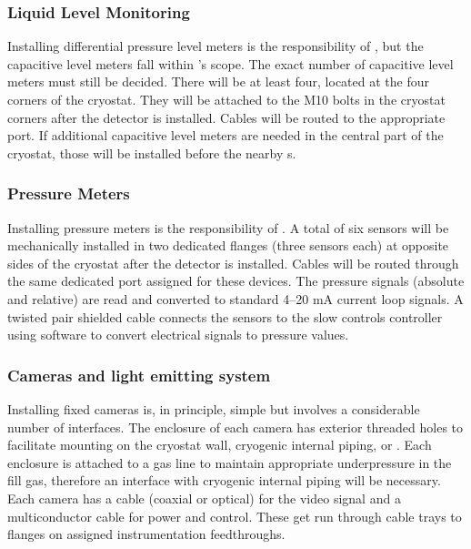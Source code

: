 \subsubsection{Liquid Level Monitoring}
\label{sec:fdgen-slow-cryo-install-llm}

Installing differential pressure level meters is the responsibility of , but the capacitive level meters fall within 's scope. The exact number of capacitive level meters must still be decided. There will be at least four, located at the four corners of the cryostat. 
They will be attached to the M10 bolts in the cryostat corners after the detector is installed. Cables will be routed to the appropriate  port. If additional capacitive level meters are needed in the central part of the cryostat, those will be installed before the nearby s. 

\subsubsection{Pressure Meters}
\label{sec:fdgen-slow-cryo-install-press}
Installing pressure meters is the responsibility of . A total of six sensors will be mechanically installed in two dedicated flanges (three sensors each) at opposite sides of the cryostat after the detector is installed. Cables will be routed through the same dedicated port assigned for these devices. The pressure signals (absolute and relative) are read and converted to
standard 4--20 mA current loop signals.
A twisted pair shielded cable connects the sensors to the slow controls  controller using software to convert electrical signals to pressure values.

\subsubsection{Cameras and light emitting system}
\label{sec:fdgen-slow-cryo-install-c}

Installing fixed cameras is, in principle, simple but involves a
considerable number of interfaces. The enclosure of each camera has
exterior threaded holes to facilitate mounting on the cryostat wall,
cryogenic internal piping, or . Each
enclosure %
is attached to a gas line to maintain appropriate
underpressure in the fill gas, %
therefore an interface with cryogenic
internal piping will be necessary. Each camera has a cable (coaxial or
optical) for the video signal and a multiconductor cable for power and
control. These %
get run through cable trays to flanges on assigned
instrumentation feedthroughs.

